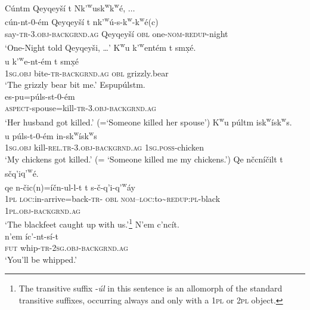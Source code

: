 \documentclass[output=paper,colorlinks,citecolor=brown]{langscibook}
\begin{document}
\ea 
\label{ex-thomason-18}
C\'untm Qeyqey\v{s}\'i t N{k'\textsuperscript w}us{k\textsuperscript w}{k\textsuperscript w}\textglotstop\'e, $\ldots$ \\
 \gll c\'un-nt-0-\'em Qeyqey\v{s}\'i t
n{k'\textsuperscript w}\'u\textglotstop-s-{k\textsuperscript w}-{k\textsuperscript w}\textglotstop\'e(c) \\
say-\textsc{tr}-3.\textsc{obj}-\textsc{backgrnd.ag} Qeyqey\v{s}\'i \textsc{obl} one-\textsc{nom}-\textsc{redup}-night \\
 \glt `One-Night told Qeyqey\v{s}i,  \ldots '
 \ex 
\label{ex-thomason-19}
{K\textsuperscript w}u {k'\textsuperscript w}e{\textglotstop}nt\'em t sm\d{x}\'e. \\
u {k'\textsuperscript
 w}e{\textglotstop}-nt-\'em t sm\d{x}\'e\\
\textsc{1sg}.\textsc{obj} bite-\textsc{tr}-\textsc{backgrnd.ag} \textsc{obl} grizzly.bear\\
\glt `The grizzly bear bit me.'
\ex
\label{ex-thomason-20}
Espu{\textglotstop}p\'ulstm.  \\
\gll es-pu\textglotstop=p\'uls-st-0-\'em \\
\textsc{aspect}-spouse=kill-\textsc{tr}-3.\textsc{obj}-\textsc{backgrnd.ag}\\
\glt `Her husband got killed.' (=`Someone killed her spouse')
\ex 
\label{ex-thomason-21}
{K\textsuperscript w}u p\'ul{\textltilde}tm is{k\textsuperscript w}\'is{k\textsuperscript w}s. \\
u p\'uls-{\textltilde}t-0-\'em
in-s{k\textsuperscript w}\'is{k\textsuperscript w}s\\
\textsc{\textsc{1sg}.obj} kill-\textsc{rel.tr}-3.\textsc{obj}-\textsc{backgrnd.ag} \textsc{1sg}.\textsc{poss}-chicken\\
\glt `My chickens got killed.' (= `Someone killed me my chickens.')
\ex 
\label{ex-thomason-22}
Qe n\v{c}cn\'i\v{c}i{\textltilde}lt t s\v{c}q'i{q'\textsuperscript w}\'e.  \\
 \gll qe n-\v{c}ic(n)=\'i\v{c}n-{\textltilde}ul-l-t t
s-\v{c}-q'i-{q'\textsuperscript w}\'ay\\
\textsc{1pl} \textsc{loc}:in-arrive=back-\textsc{tr}-
\textsc{obl} \textsc{nom}--\textsc{loc}:to\textasciitilde{}\textsc{redup:pl}-black\\
\textsc{1pl}.\textsc{obj}-\textsc{backgrnd.ag}\\
 \glt `The blackfeet caught up with
us.'\footnote{The transitive suffix -\emph{{\textltilde}\'ul} in this
sentence is an allomorph of the standard transitive suffixes,
occurring always and only with a \textsc{1pl} or \textsc{2pl} object.}
\ex 
\label{ex-thomason-23}
N'em {\textltilde}c'nc\'it. \\
\gll n'em \textltilde\'ic'-nt-s\'i-t\\ 
\textsc{fut} whip-\textsc{tr}-\textsc{2sg}.\textsc{obj-backgrnd.ag}\\
\glt  `You'll be whipped.'
\z
\end{document}
